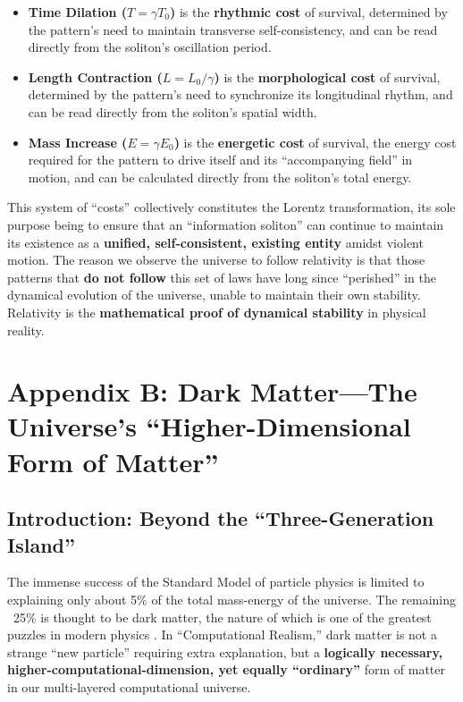 \documentclass[11pt, a4paper]{article}
\begin{document}
\begin{itemize}
    \item \textbf{Time Dilation ($T=\gamma T_0$)} is the \textbf{rhythmic cost} of survival, determined by the pattern's need to maintain transverse self-consistency, and can be read directly from the soliton's oscillation period.
    \item \textbf{Length Contraction ($L=L_0/\gamma$)} is the \textbf{morphological cost} of survival, determined by the pattern's need to synchronize its longitudinal rhythm, and can be read directly from the soliton's spatial width.
    \item \textbf{Mass Increase ($E=\gamma E_0$)} is the \textbf{energetic cost} of survival, the energy cost required for the pattern to drive itself and its ``accompanying field'' in motion, and can be calculated directly from the soliton's total energy.
\end{itemize}

This system of ``costs'' collectively constitutes the Lorentz transformation, its sole purpose being to ensure that an ``information soliton'' can continue to maintain its existence as a \textbf{unified, self-consistent, existing entity} amidst violent motion. The reason we observe the universe to follow relativity is that those patterns that \textbf{do not follow} this set of laws have long since ``perished'' in the dynamical evolution of the universe, unable to maintain their own stability. Relativity is the \textbf{mathematical proof of dynamical stability} in physical reality.

\section{Appendix B: Dark Matter—The Universe's ``Higher-Dimensional Form of Matter''}

\subsection{Introduction: Beyond the ``Three-Generation Island''}
The immense success of the Standard Model of particle physics is limited to explaining only about 5\% of the total mass-energy of the universe. The remaining ~25\% is thought to be dark matter, the nature of which is one of the greatest puzzles in modern physics \cite{Planck2020}. In ``Computational Realism,'' dark matter is not a strange ``new particle'' requiring extra explanation, but a \textbf{logically necessary, higher-computational-dimension, yet equally ``ordinary''} form of matter in our multi-layered computational universe.
\end{document}
